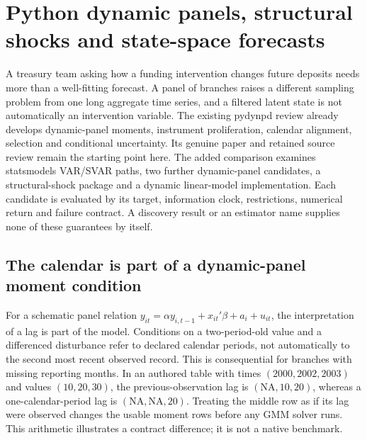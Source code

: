 \section[Python dynamic panels and shocks]{Python dynamic panels, structural shocks and state-space forecasts}
\label{sec:exec25-python-dynamic}

A treasury team asking how a funding intervention changes future deposits needs more than a well-fitting forecast. A panel of branches raises a different sampling problem from one long aggregate time series, and a filtered latent state is not automatically an intervention variable. The existing pydynpd review already develops dynamic-panel moments, instrument proliferation, calendar alignment, selection and conditional uncertainty. Its genuine paper and retained source review remain the starting point here. The added comparison examines statsmodels VAR/SVAR paths, two further dynamic-panel candidates, a structural-shock package and a dynamic linear-model implementation. Each candidate is evaluated by its target, information clock, restrictions, numerical return and failure contract. A discovery result or an estimator name supplies none of these guarantees by itself.\citep{exec24_pydynpd_paper,exec24_pydynpd_source,exec25_pydyn_choice}

\subsection{The calendar is part of a dynamic-panel moment condition}

For a schematic panel relation $y_{it}=\alpha y_{i,t-1}+x_{it}'\beta+a_i+u_{it}$, the interpretation of a lag is part of the model. Conditions on a two-period-old value and a differenced disturbance refer to declared calendar periods, not automatically to the second most recent observed record. This is consequential for branches with missing reporting months. In an authored table with times $(2000,2002,2003)$ and values $(10,20,30)$, the previous-observation lag is $(\mathrm{NA},10,20)$, whereas a one-calendar-period lag is $(\mathrm{NA},\mathrm{NA},20)$. Treating the middle row as if its lag were observed changes the usable moment rows before any GMM solver runs. This arithmetic illustrates a contract difference; it is not a native benchmark.\citep{exec24_pydynpd_source,exec25_pydyn_choice}

